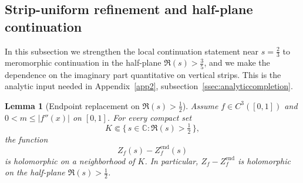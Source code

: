 \documentclass[a4paper,american,11pt]{amsart}
\theoremstyle{plain}
\newtheorem{lemma}[theorem]{Lemma}
\theoremstyle{definition}
\newcommand{\C}{\mathbb C}
\begin{document}

\subsection{Strip-uniform refinement and half-plane continuation}
\label{ssec:striprefinement}

In this subsection we strengthen the local continuation statement near \(s=\tfrac23\)
to meromorphic continuation in the half-plane \(\Re(s)>\tfrac35\), and we make the
dependence on the imaginary part quantitative on vertical strips. This is the analytic
input needed in Appendix~\ref{app2}, subsection~\ref{ssec:analyticcompletion}.

\begin{lemma}[Endpoint replacement on \(\Re(s)>\tfrac12\)]
\label{lem:replace-halfplane}
Assume \(f\in C^3([0,1])\) and \(0<m\le |f''(x)|\) on \([0,1]\).
For every compact set
\[
K\Subset \{\,s\in\C:\Re(s)>\tfrac12\,\},
\]
the function
\[
Z_f(s)-Z_f^{\mathrm{end}}(s)
\]
is holomorphic on a neighborhood of \(K\). In particular, \(Z_f-Z_f^{\mathrm{end}}\)
is holomorphic on the half-plane \(\Re(s)>\tfrac12\).
\end{lemma}
\end{document}
